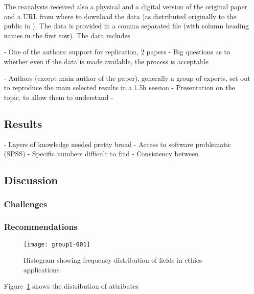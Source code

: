 The reanalysts received also a physical and a digital version of the original paper and a URL from where to download the data (as distributed originally to the public in \cite{Nacenta:memorability_data}). The data is provided in a comma separated file (with column heading names in the first row). The data includes 




- One of the authors: support for replication, 2 papers
- Big questions as to whether even if the data is made available, the process is acceptable

- Authors (except main author of the paper), generally a group of experts, set out to reproduce the main selected results in a 1.5h session
- Presentation on the topic, to allow them to understand
- 

\subsection{Results}
- Layers of knowledge needed pretty broad
- Access to software problematic (SPSS)
- Specific numbers difficult to find
- Consistency between 

\subsection{Discussion}

\subsubsection{Challenges}

\subsubsection{Recommendations}





\begin{figure}
\begin{minipage}{\linewidth}
\texttt{[image: group1-001]}
\caption{\label{p:ethicsFreq}Histogram showing frequency distribution of fields in ethics applications}
\end{minipage}
\end{figure}

Figure~\ref{p:ethicsFreq} shows the distribution of attributes 
